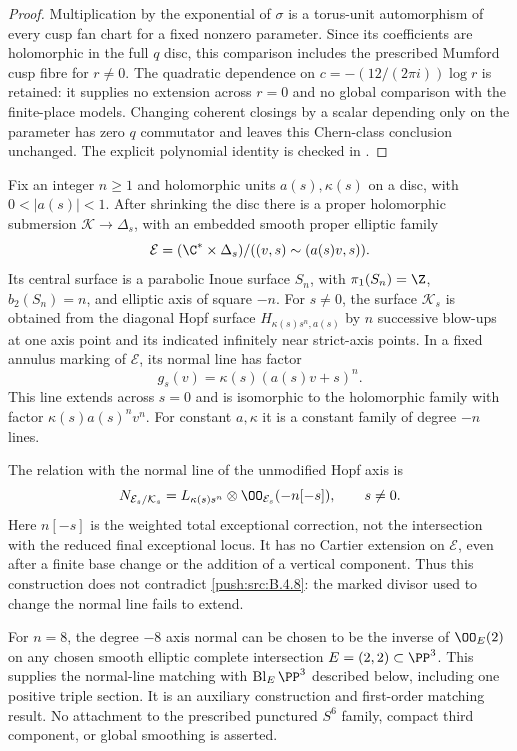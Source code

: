 \begin{proof}
Multiplication by the exponential of $\sigma$
is a torus-unit automorphism of every cusp fan
chart for a fixed nonzero parameter.  Since its
coefficients are holomorphic in the full $q$
disc, this comparison includes the prescribed
Mumford cusp fibre for $r\ne0$.  The quadratic
dependence on $c=-(12/(2\pi i))\log r$ is retained:
it supplies no extension across $r=0$ and no
global comparison with the finite-place models.
Changing coherent closings by a scalar depending
only on the parameter has zero $q$ commutator
and leaves this Chern-class conclusion unchanged.
The explicit polynomial identity is checked in
.
\end{proof}

\begin{proposition}\label{push:src:B.4.10}
Fix an integer $n\ge1$ and holomorphic units $a(s),\kappa(s)$ on a
disc, with $0<|a(s)|<1$. After shrinking the disc there is a proper
holomorphic submersion $\mathcal K\to\Delta_s$, with an embedded smooth
proper elliptic family
\[
 \mathcal E=(\C^*\times\Delta_s)/
       ((v,s)\sim(a(s)v,s)).
\]
Its central surface is a parabolic Inoue surface $S_n$, with
$\pi_1(S_n)=\Z$, $b_2(S_n)=n$, and elliptic axis of square $-n$.
For $s\ne0$, the surface $\mathcal K_s$ is obtained from the diagonal
Hopf surface $H_{\kappa(s)s^n,a(s)}$ by $n$ successive blow-ups at one
axis point and its indicated infinitely near strict-axis points.
In a fixed annulus marking of $\mathcal E$, its normal line has factor
\[
 g_s(v)=\kappa(s)(a(s)v+s)^n.
\]
This line extends across $s=0$ and is isomorphic to the holomorphic
family with factor $\kappa(s)a(s)^n v^n$.
For constant $a,\kappa$ it is a constant family of degree $-n$ lines.

The relation with the normal line of the unmodified Hopf axis is
\[
 N_{\mathcal E_s/\mathcal K_s}
   =L_{\kappa(s)s^n}\otimes\OO_{\mathcal E_s}(-n[-s]),
       \qquad s\ne0.
\]
Here $n[-s]$ is the weighted total exceptional correction, not the
intersection with the reduced final exceptional locus. It has no
Cartier extension on $\mathcal E$, even after a finite base change or
the addition of a vertical component. Thus this construction does
not contradict \ref{push:src:B.4.8}: the marked divisor used to change the normal
line fails to extend.

For $n=8$, the degree $-8$ axis normal can be chosen to be the inverse
of $\OO_E(2)$ on any chosen smooth elliptic complete intersection
$E=(2,2)\subset\PP^3$. This supplies the normal-line matching with
$\operatorname{Bl}_E\PP^3$ described below, including one positive
triple section. It is an auxiliary construction and first-order
matching result. No attachment to the prescribed punctured
$S^6$ family, compact third component, or global smoothing is asserted.
\end{proposition}

